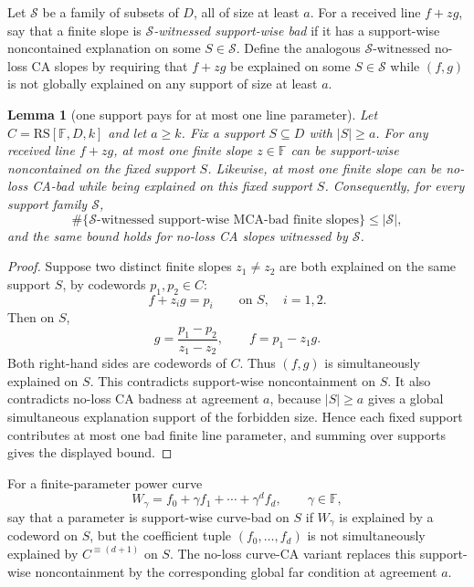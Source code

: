 \documentclass[11pt]{article}
\newtheorem{lemma}[lemma]{Lemma}
\theoremstyle{definition}
\theoremstyle{remark}
\newcommand{\F}{\mathbb{F}}
\newcommand{\RS}{\mathrm{RS}}
\begin{document}
Let $\mathcal S$ be a family of subsets of $D$, all of size at least $a$.  For a
received line $f+zg$, say that a finite slope is
\emph{$\mathcal S$-witnessed support-wise bad} if it has a support-wise
noncontained explanation on some $S\in\mathcal S$.  Define the analogous
$\mathcal S$-witnessed no-loss CA slopes by requiring that $f+zg$ be explained
on some $S\in\mathcal S$ while $(f,g)$ is not globally explained on any support
of size at least $a$.

\begin{lemma}[one support pays for at most one line parameter]
\label{lem:one-support-one-line}
Let $C=\RS[\F,D,k]$ and let $a\ge k$.  Fix a support
$S\subseteq D$ with $|S|\ge a$.  For any received line $f+zg$, at most one finite
slope $z\in\F$ can be support-wise noncontained on the fixed support $S$.
Likewise, at most one finite slope can be no-loss CA-bad while being explained on
this fixed support $S$.  Consequently, for every support family $\mathcal S$,
\[
        \#\{\mathcal S\text{-witnessed support-wise MCA-bad finite slopes}\}
        \le |\mathcal S|,
\]
and the same bound holds for no-loss CA slopes witnessed by $\mathcal S$.
\end{lemma}

\begin{proof}
Suppose two distinct finite slopes $z_1\ne z_2$ are both explained on the same
support $S$, by codewords $p_1,p_2\in C$:
\[
        f+z_i g=p_i\qquad\text{on }S,\quad i=1,2.
\]
Then on $S$,
\[
        g=\frac{p_1-p_2}{z_1-z_2},\qquad
        f=p_1-z_1g.
\]
Both right-hand sides are codewords of $C$.  Thus $(f,g)$ is simultaneously
explained on $S$.  This contradicts support-wise noncontainment on $S$.  It also
contradicts no-loss CA badness at agreement $a$, because $|S|\ge a$ gives a
global simultaneous explanation support of the forbidden size.  Hence each fixed
support contributes at most one bad finite line parameter, and summing over
supports gives the displayed bound.
\end{proof}

For a finite-parameter power curve
\[
        W_\gamma=f_0+\gamma f_1+\cdots+\gamma^d f_d,
        \qquad \gamma\in\F,
\]
say that a parameter is support-wise curve-bad on $S$ if $W_\gamma$ is explained
by a codeword on $S$, but the coefficient tuple $(f_0,\ldots,f_d)$ is not
simultaneously explained by $C^{\equiv(d+1)}$ on $S$.  The no-loss curve-CA
variant replaces this support-wise noncontainment by the corresponding global
far condition at agreement $a$.
\end{document}
